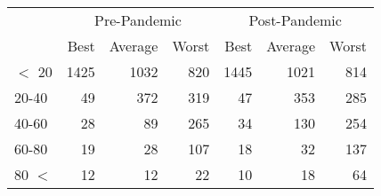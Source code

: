 
\begin{tabular}[t]{lrrrrrr}
\toprule
\multicolumn{1}{c}{ } & \multicolumn{3}{c}{Pre-Pandemic} & \multicolumn{3}{c}{Post-Pandemic} \\
\cmidrule(l{3pt}r{3pt}){2-4} \cmidrule(l{3pt}r{3pt}){5-7}
 & Best & Average & Worst & Best & Average & Worst\\
\midrule
$<$ 20 & 1425 & 1032 & 820 & 1445 & 1021 & 814\\
20-40 & 49 & 372 & 319 & 47 & 353 & 285\\
40-60 & 28 & 89 & 265 & 34 & 130 & 254\\
60-80 & 19 & 28 & 107 & 18 & 32 & 137\\
80 $<$ & 12 & 12 & 22 & 10 & 18 & 64\\
\bottomrule
\end{tabular}
